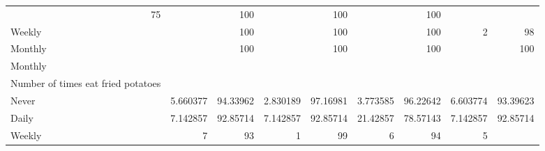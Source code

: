 \documentclass{article}
\begin{document}
\begin{tabular}{lllllllll}
  \multicolumn{1}{r}{75} &
  \multicolumn{1}{r}{} &
  \multicolumn{1}{r}{100} &
  \multicolumn{1}{r}{} &
  \multicolumn{1}{r}{100} &
  \multicolumn{1}{r}{} &
  \multicolumn{1}{r}{100} \\
\multicolumn{1}{l}{\hspace{7em}Weekly} &
  \multicolumn{1}{|r}{} &
  \multicolumn{1}{r}{100} &
  \multicolumn{1}{r}{} &
  \multicolumn{1}{r}{100} &
  \multicolumn{1}{r}{} &
  \multicolumn{1}{r}{100} &
  \multicolumn{1}{r}{2} &
  \multicolumn{1}{r}{98} \\
\multicolumn{1}{l}{\hspace{7em}Monthly} &
  \multicolumn{1}{|r}{} &
  \multicolumn{1}{r}{100} &
  \multicolumn{1}{r}{} &
  \multicolumn{1}{r}{100} &
  \multicolumn{1}{r}{} &
  \multicolumn{1}{r}{100} &
  \multicolumn{1}{r}{} &
  \multicolumn{1}{r}{100} \\
\multicolumn{1}{l}{\hspace{5em}Monthly} &
  \multicolumn{1}{|r}{} &
  \multicolumn{1}{r}{} &
  \multicolumn{1}{r}{} &
  \multicolumn{1}{r}{} &
  \multicolumn{1}{r}{} &
  \multicolumn{1}{r}{} &
  \multicolumn{1}{r}{} &
  \multicolumn{1}{r}{} \\
\multicolumn{1}{l}{\hspace{6em}Number of times eat fried potatoes} &
  \multicolumn{1}{|r}{} &
  \multicolumn{1}{r}{} &
  \multicolumn{1}{r}{} &
  \multicolumn{1}{r}{} &
  \multicolumn{1}{r}{} &
  \multicolumn{1}{r}{} &
  \multicolumn{1}{r}{} &
  \multicolumn{1}{r}{} \\
\multicolumn{1}{l}{\hspace{7em}Never} &
  \multicolumn{1}{|r}{5.660377} &
  \multicolumn{1}{r}{94.33962} &
  \multicolumn{1}{r}{2.830189} &
  \multicolumn{1}{r}{97.16981} &
  \multicolumn{1}{r}{3.773585} &
  \multicolumn{1}{r}{96.22642} &
  \multicolumn{1}{r}{6.603774} &
  \multicolumn{1}{r}{93.39623} \\
\multicolumn{1}{l}{\hspace{7em}Daily} &
  \multicolumn{1}{|r}{7.142857} &
  \multicolumn{1}{r}{92.85714} &
  \multicolumn{1}{r}{7.142857} &
  \multicolumn{1}{r}{92.85714} &
  \multicolumn{1}{r}{21.42857} &
  \multicolumn{1}{r}{78.57143} &
  \multicolumn{1}{r}{7.142857} &
  \multicolumn{1}{r}{92.85714} \\
\multicolumn{1}{l}{\hspace{7em}Weekly} &
  \multicolumn{1}{|r}{7} &
  \multicolumn{1}{r}{93} &
  \multicolumn{1}{r}{1} &
  \multicolumn{1}{r}{99} &
  \multicolumn{1}{r}{6} &
  \multicolumn{1}{r}{94} &
  \multicolumn{1}{r}{5} &

\end{tabular}
\end{document}
